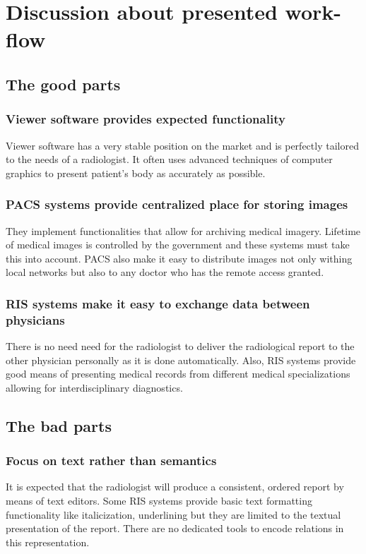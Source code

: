 \documentclass[12pt, twoside, openany]{report}
\theoremstyle{definition}
\begin{document}
\section{Discussion about presented work-flow}
\subsection{The good parts}
\subsubsection{Viewer software provides expected functionality}
Viewer software has a very stable position on the market and is perfectly tailored to the needs of a radiologist. It often uses advanced techniques of computer graphics to present patient's body as accurately as possible.
\subsubsection{PACS systems provide centralized place for storing images}
They implement functionalities that allow for archiving medical imagery. Lifetime of medical images is controlled by the government and these systems must take this into account. PACS also make it easy to distribute images not only withing local networks but also to any doctor who has the remote access granted.
\subsubsection{RIS systems make it easy to exchange data between physicians}
There is no need need for the radiologist to deliver the radiological report to the other physician personally as it is done automatically. Also, RIS systems provide good means of presenting medical records from different medical specializations allowing for interdisciplinary diagnostics. 
\subsection{The bad parts}
\subsubsection{Focus on text rather than semantics}
It is expected that the radiologist will produce a consistent, ordered report by means of text editors. Some RIS systems provide basic text formatting functionality like italicization, underlining but they are limited to the textual presentation of the report. There are no dedicated tools to encode relations in this representation.
\end{document}
